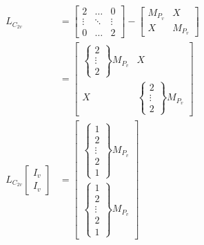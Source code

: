 \documentclass[12pt,a4paper]{article}
\begin{document}
\begin{align*}
    L_{C_{2v}} &= \begin{bmatrix}
    2 & \hdots & 0 \\
    \vdots & \ddots & \vdots \\
    0 & \hdots & 2
    \end{bmatrix} - \begin{bmatrix}
    M_{P_v} & X \\
    X & M_{P_v}
    \end{bmatrix} \\
    &= \begin{bmatrix}
    \begin{Bmatrix}
    2 \\
    \vdots \\
    2
    \end{Bmatrix}M_{P_v} & X \\
    X & \begin{Bmatrix} 2 \\ \vdots \\ 2\end{Bmatrix}M_{P_v}
    \end{bmatrix} \\
    L_{C_{2v}}\begin{bmatrix}I_v \\ I_v\end{bmatrix} &= \begin{bmatrix}\begin{Bmatrix} 1 \\ 2 \\ \vdots \\ 2 \\ 1 \end{Bmatrix}M_{P_v} \\\begin{Bmatrix} 1 \\ 2 \\ \vdots \\ 2 \\ 1 \end{Bmatrix}M_{P_v}\end{bmatrix}
\end{align*}
\end{document}
